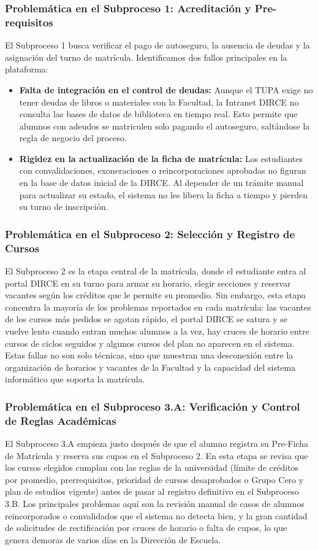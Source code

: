 \subsubsection{Problemática en el Subproceso 1: Acreditación y Pre-requisitos}
El Subproceso 1 busca verificar el pago de autoseguro, la ausencia de deudas y la asignación del turno de matrícula. Identificamos dos fallos principales en la plataforma:
\begin{itemize}
\item \textbf{Falta de integración en el control de deudas:} Aunque el TUPA exige no tener deudas de libros o materiales con la Facultad, la Intranet DIRCE no consulta las bases de datos de biblioteca en tiempo real. Esto permite que alumnos con adeudos se matriculen solo pagando el autoseguro, saltándose la regla de negocio del proceso.
\item \textbf{Rigidez en la actualización de la ficha de matrícula:} Los estudiantes con convalidaciones, exoneraciones o reincorporaciones aprobadas no figuran en la base de datos inicial de la DIRCE. Al depender de un trámite manual para actualizar su estado, el sistema no les libera la ficha a tiempo y pierden su turno de inscripción.
\end{itemize}

\subsubsection{Problemática en el Subproceso 2: Selección y Registro de Cursos}
El Subproceso 2 es la etapa central de la matrícula, donde el estudiante entra al portal DIRCE en su turno para armar su horario, elegir secciones y reservar vacantes según los créditos que le permite su promedio. Sin embargo, esta etapa concentra la mayoría de los problemas reportados en cada matrícula: las vacantes de los cursos más pedidos se agotan rápido, el portal DIRCE se satura y se vuelve lento cuando entran muchos alumnos a la vez, hay cruces de horario entre cursos de ciclos seguidos y algunos cursos del plan no aparecen en el sistema. Estas fallas no son solo técnicas, sino que muestran una desconexión entre la organización de horarios y vacantes de la Facultad y la capacidad del sistema informático que soporta la matrícula.

\subsubsection{Problemática en el Subproceso 3.A: Verificación y Control de Reglas Académicas}
El Subproceso 3.A empieza justo después de que el alumno registra su Pre-Ficha de Matrícula y reserva sus cupos en el Subproceso 2. En esta etapa se revisa que los cursos elegidos cumplan con las reglas de la universidad (límite de créditos por promedio, prerrequisitos, prioridad de cursos desaprobados o Grupo Cero y plan de estudios vigente) antes de pasar al registro definitivo en el Subproceso 3.B. Los principales problemas aquí son la revisión manual de casos de alumnos reincorporados o convalidados que el sistema no detecta bien, y la gran cantidad de solicitudes de rectificación por cruces de horario o falta de cupos, lo que genera demoras de varios días en la Dirección de Escuela.

